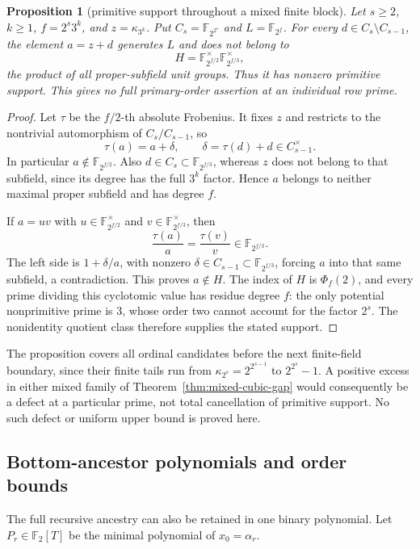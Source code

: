 \documentclass[11pt]{article}
\newtheorem{proposition}[theorem]{Proposition}
\theoremstyle{definition}
\theoremstyle{remark}
\begin{document}
\begin{proposition}[primitive support throughout a mixed finite block]
\label{prop:mixed-cubic-support}
Let $s\geq2$, $k\geq1$, $f=2^s3^k$, and $z=\kappa_{3^k}$.
Put $C_s=\mathbb F_{2^{2^s}}$ and
$L=\mathbb F_{2^f}$. For every $d\in C_s\setminus C_{s-1}$,
the element $a=z+d$ generates $L$ and does not belong to
\[
 H=\mathbb F_{2^{f/2}}^\times\mathbb F_{2^{f/3}}^\times,
\]
the product of all proper-subfield unit groups. Thus it has nonzero
primitive support. This gives no full primary-order assertion at an
individual row prime.
\end{proposition}

\begin{proof}
Let $\tau$ be the $f/2$-th absolute Frobenius. It fixes $z$ and
restricts to the nontrivial automorphism of $C_s/C_{s-1}$, so
\[
 \tau(a)=a+\delta,\qquad
 \delta=\tau(d)+d\in C_{s-1}^\times.
\]
In particular $a\notin\mathbb F_{2^{f/2}}$. Also
$d\in C_s\subset\mathbb F_{2^{f/3}}$, whereas $z$ does not belong to
that subfield, since its degree has the full $3^k$ factor. Hence $a$
belongs to neither maximal proper subfield and has degree $f$.

If $a=uv$ with $u\in\mathbb F_{2^{f/2}}^\times$ and
$v\in\mathbb F_{2^{f/3}}^\times$, then
\[
 \frac{\tau(a)}a=\frac{\tau(v)}v
 \in\mathbb F_{2^{f/3}}.
\]
The left side is $1+\delta/a$, with nonzero
$\delta\in C_{s-1}\subset\mathbb F_{2^{f/3}}$, forcing $a$ into
that same subfield, a contradiction. This proves $a\notin H$.
The index of $H$ is $\Phi_f(2)$, and every prime dividing this
cyclotomic value has residue degree $f$: the only potential nonprimitive
prime is $3$, whose order two cannot account for the factor $2^s$.
The nonidentity quotient class therefore supplies the stated support.
\end{proof}

The proposition covers all ordinal candidates before the next finite-field
boundary, since their finite tails run from
$\kappa_{2^s}=2^{2^{s-1}}$ to $2^{2^s}-1$. A positive excess in either
mixed family of Theorem~\ref{thm:mixed-cubic-gap} would consequently be a
defect at a particular prime, not total cancellation of primitive support.
No such defect or uniform upper bound is proved here.

\subsection{Bottom-ancestor polynomials and order bounds}

The full recursive ancestry can also be retained in one binary polynomial.
Let $P_r\in\mathbb F_2[T]$ be the minimal polynomial of
$x_0=\alpha_r$.
\end{document}
